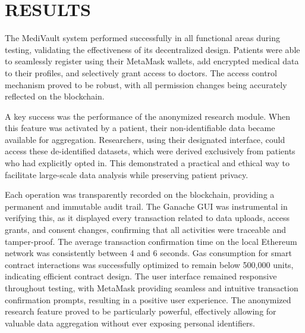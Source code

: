 \chapter{RESULTS}
\label{chap:results}

The MediVault system performed successfully in all functional areas during testing, validating the effectiveness of its decentralized design. Patients were able to seamlessly register using their MetaMask wallets, add encrypted medical data to their profiles, and selectively grant access to doctors. The access control mechanism proved to be robust, with all permission changes being accurately reflected on the blockchain.

A key success was the performance of the anonymized research module. When this feature was activated by a patient, their non-identifiable data became available for aggregation. Researchers, using their designated interface, could access these de-identified datasets, which were derived exclusively from patients who had explicitly opted in. This demonstrated a practical and ethical way to facilitate large-scale data analysis while preserving patient privacy.

Each operation was transparently recorded on the blockchain, providing a permanent and immutable audit trail. The Ganache GUI was instrumental in verifying this, as it displayed every transaction related to data uploads, access grants, and consent changes, confirming that all activities were traceable and tamper-proof. The average transaction confirmation time on the local Ethereum network was consistently between 4 and 6 seconds. Gas consumption for smart contract interactions was successfully optimized to remain below 500,000 units, indicating efficient contract design. The user interface remained responsive throughout testing, with MetaMask providing seamless and intuitive transaction confirmation prompts, resulting in a positive user experience. The anonymized research feature proved to be particularly powerful, effectively allowing for valuable data aggregation without ever exposing personal identifiers.
